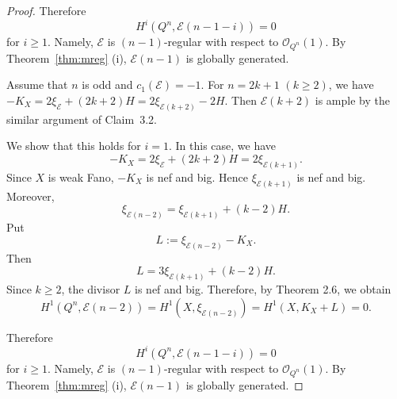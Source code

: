 \documentclass{amsproc}
\theoremstyle{definition}
\def\cE{{\mathcal E}}
\def\cO{{\mathcal{O}}}
\def\tensor{\otimes}
\begin{document}
\begin{proof}
Therefore 
$$
H^i(Q^n, \cE(n-1-i))=0
$$
for $i\ge 1$. Namely, $\cE$ is $(n-1)$-regular with respect to $\cO_{Q^n}(1)$. By Theorem~\ref{thm:mreg} (i), $\cE(n-1)$ is globally generated.

Assume that $n$ is odd and $c_1(\cE)=-1$. For  $n=2k+1$ $(k\ge2)$, we have $-K_X=2\xi_{\cE}+(2k+2)H=2\xi_{\cE(k+2)}-2H$. Then $\cE(k+2)$ is ample by  the similar   argument of Claim~3.2. 
 
We show that this holds for \(i=1\). In this case, we have
$$
-K_X=2\xi_{\mathcal{E}}+(2k+2)H=2\xi_{\mathcal{E}(k+1)}.
$$
Since \(X\) is weak Fano, \(-K_X\) is nef and big. Hence
\(\xi_{\mathcal{E}(k+1)}\) is nef and big. Moreover,
$$
\xi_{\mathcal{E}(n-2)}
=
\xi_{\mathcal{E}(k+1)}+(k-2)H.
$$
Put
$$
L:=\xi_{\mathcal{E}(n-2)}-K_X.
$$
Then
$$
L
=
3\xi_{\mathcal{E}(k+1)}+(k-2)H.
$$
Since \(k\geq 2\), the divisor \(L\) is nef and big. Therefore, by
Theorem 2.6, we obtain
$$
H^1(Q^n,\mathcal{E}(n-2))
=
H^1(X,\xi_{\mathcal{E}(n-2)})
=
H^1(X,K_X+L)
=0.
$$

Therefore 
$$
H^i(Q^n, \cE(n-1-i))=0
$$
for $i\ge 1$. Namely, $\cE$ is $(n-1)$-regular with respect to $\cO_{Q^n}(1)$. By Theorem~\ref{thm:mreg} (i), $\cE(n-1)$ is globally generated. 


\end{proof}
\end{document}
